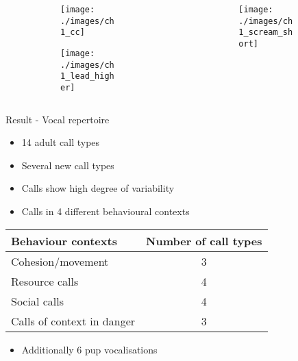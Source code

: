 \documentclass[xcolor=dvipsnames]{beamer}
\begin{document}
\begin{frame}
\begin{columns}
\begin{column}{.40\textwidth}
\begin{figure}
\begin{subfigure}{\textwidth}
\centering
\texttt{[image: ./images/ch1\_cc]}
\end{subfigure} \smallskip

\begin{subfigure}{\textwidth}
\centering
\texttt{[image: ./images/ch1\_lead\_higher]} 
\end{subfigure}
\end{figure}
\end{column}
\begin{column}{.40\textwidth}
\begin{figure}
\begin{subfigure}{\textwidth}
\centering
\texttt{[image: ./images/ch1\_scream\_short]}  
\end{subfigure}
\end{figure}
\end{column}
\end{columns}
\end{frame}
\begin{frame}{Result - Vocal repertoire}
\begin{itemize}
\item 14 adult call types 
\item Several new call types
\item Calls show high degree of variability 
\item Calls in 4 different behavioural contexts
\end{itemize}

\begin{table}
\centering
\begin{tabular}{lc}
\toprule
Behaviour contexts  & Number of call types \\
\midrule
Cohesion$/$movement & 3 \\
Resource calls & 4 \\
Social calls & 4 \\
Calls of context in danger &  3 \\
\bottomrule
\end{tabular}
\end{table}

\begin{itemize}
\item Additionally 6 pup vocalisations
\end{itemize}
\end{frame}
\end{document}
